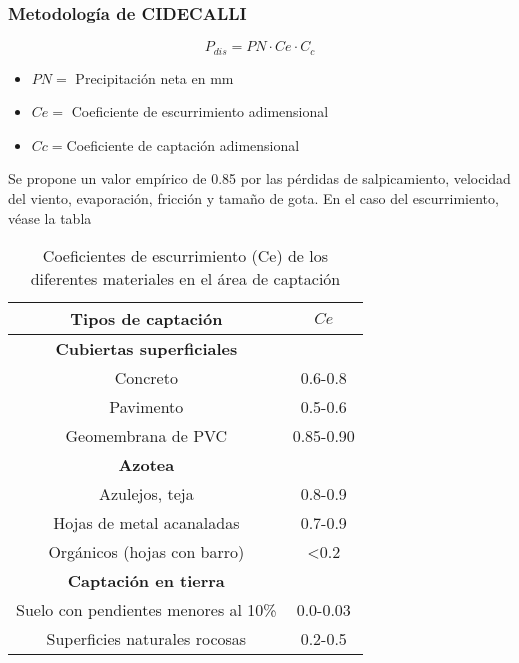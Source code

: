 \subsubsection{Metodología de CIDECALLI}
\begin{equation}
    P_{dis} = PN \cdot Ce \cdot C_c
\end{equation}
\begin{notation}
\begin{itemize}
    \item $PN=$ Precipitación neta en mm
    \item $Ce=$ Coeficiente de escurrimiento adimensional
    \item $Cc=$Coeficiente de captación adimensional
\end{itemize}
\end{notation}
Se propone un valor empírico de 0.85 por las pérdidas de salpicamiento, velocidad del viento, evaporación, fricción y tamaño de gota.
En el caso del escurrimiento, véase la tabla
\begin{table}[h!]
    \centering
    \begin{tabular}{@{}cc@{}}
    \toprule
    Tipos de captación                   & $Ce$           \\ \midrule
    \textbf{Cubiertas superficiales}     &                \\
    Concreto                             & 0.6-0.8        \\
    Pavimento                            & 0.5-0.6        \\
    Geomembrana de PVC                   & 0.85-0.90      \\
    \textbf{Azotea}                      &                \\
    Azulejos, teja                       & 0.8-0.9        \\
    Hojas de metal acanaladas            & 0.7-0.9        \\
    Orgánicos (hojas con barro)          & \textless{}0.2 \\
    \textbf{Captación en tierra}         &                \\
    Suelo con pendientes menores al 10\% & 0.0-0.03       \\
    Superficies naturales rocosas        & 0.2-0.5        \\ \bottomrule
    \end{tabular}
    \caption{Coeficientes de escurrimiento (Ce) de los diferentes materiales en el área de captación}
    \label{tabtusa1}
\end{table}

